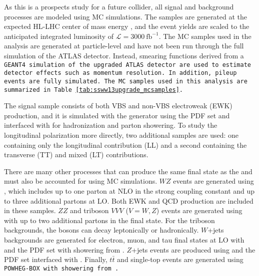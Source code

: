 As this is a prospects study for a future collider, all signal and background processes are modeled using MC simulations.
The samples are generated at the expected HL-LHC center of mass energy , and the event yields are scaled to the anticipated integrated luminosity of $\mathcal{L}=3000~\textrm{fb}^{-1}$.
The MC samples used in the analysis are generated at particle-level and have not been run through the full simulation of the ATLAS detector.
Instead, smearing functions derived from a \tt{GEANT4} simulation of the upgraded ATLAS detector are used to estimate detector effects such as momentum resolution.
In addition, pileup events are fully simulated.
The MC samples used in this analysis are summarized in Table~\ref{tab:ssww13upgrade_mcsamples}.

The signal sample consists of both VBS and non-VBS electroweak (EWK) \ssww production, and it is simulated with the \mcatnlo generator using the \nnpdf PDF set and interfaced with  \cite{2015.pythia82} for hadronization and parton showering.
To study the longitudinal polarization more directly, two additional \mcatnlo \ssww samples are used: one containing only the longitudinal contribution (LL) and a second containing the transverse (TT) and mixed (LT) contributions.

There are many other processes that can produce the same final state as the \ssww and must also be accounted for using MC simulations.
$WZ$ events are generated using , which includes up to one parton at NLO in the strong coupling constant and up to three additional partons at LO.  
Both EWK and QCD production are included in these samples.
$ZZ$ and triboson $VVV$ ($V = W,Z$) events are generated using  with up to two additional partons in the final state.
For the triboson backgrounds, the bosons can decay leptonically or hadronically.
$W$+jets backgrounds are generated for electron, muon, and tau final states at LO with \mcatnlo and the \nnpdf PDF set with showering from .
$Z$+jets events are produced using  and the \ctten PDF set interfaced with .
Finally, $t\bar{t}$ and single-top events are generated using \tt{POWHEG-BOX} with showering from .


